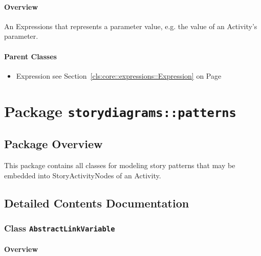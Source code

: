 \paragraph{Overview}

	
			
An Expressions that represents a parameter value, e.g. the value of an Activity's parameter.	
		
	



\paragraph{Parent Classes}
\begin{itemize}
\item Expression see Section~\ref{cls:core::expressions::Expression} on Page~\pageref{cls:core::expressions::Expression}\end{itemize}
\newpage
		


\section{Package \bfseries \texttt{storydiagrams::patterns}\normalfont}
\subsection{Package Overview}
	
			
This package contains all classes for modeling story patterns that may be 
embedded into StoryActivityNodes of an Activity.	
		
	
			
		



\subsection{Detailed Contents Documentation}
\subsubsection{\Large{Class \bfseries \texttt{AbstractLinkVariable}\normalfont}}
\label{cls:storydiagrams::patterns::AbstractLinkVariable} 
\paragraph{Overview}

